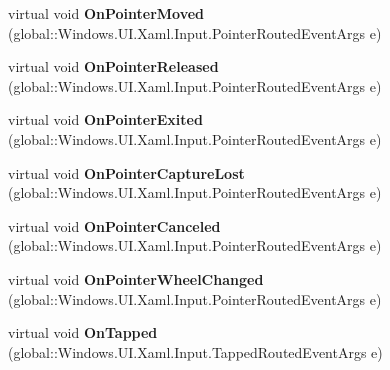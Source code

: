 \begin{DoxyCompactItemize}
virtual void {\bfseries On\+Pointer\+Moved} (global\+::\+Windows.\+U\+I.\+Xaml.\+Input.\+Pointer\+Routed\+Event\+Args e)
\item 
\mbox{\label{class_windows_1_1_u_i_1_1_xaml_1_1_controls_1_1_control_a1a16d49c087d495de68e1f9953a4ebfd}} 
virtual void {\bfseries On\+Pointer\+Released} (global\+::\+Windows.\+U\+I.\+Xaml.\+Input.\+Pointer\+Routed\+Event\+Args e)
\item 
\mbox{\label{class_windows_1_1_u_i_1_1_xaml_1_1_controls_1_1_control_a57ecaf6968ada920336dd8afd70ad576}} 
virtual void {\bfseries On\+Pointer\+Exited} (global\+::\+Windows.\+U\+I.\+Xaml.\+Input.\+Pointer\+Routed\+Event\+Args e)
\item 
\mbox{\label{class_windows_1_1_u_i_1_1_xaml_1_1_controls_1_1_control_a2f9ad5125fbed9d126ebcfd2b0fe794c}} 
virtual void {\bfseries On\+Pointer\+Capture\+Lost} (global\+::\+Windows.\+U\+I.\+Xaml.\+Input.\+Pointer\+Routed\+Event\+Args e)
\item 
\mbox{\label{class_windows_1_1_u_i_1_1_xaml_1_1_controls_1_1_control_a94fec4012722a7b1310cbc30233b7940}} 
virtual void {\bfseries On\+Pointer\+Canceled} (global\+::\+Windows.\+U\+I.\+Xaml.\+Input.\+Pointer\+Routed\+Event\+Args e)
\item 
\mbox{\label{class_windows_1_1_u_i_1_1_xaml_1_1_controls_1_1_control_a05f4eb2e6e829dbc04ce27f21650e77d}} 
virtual void {\bfseries On\+Pointer\+Wheel\+Changed} (global\+::\+Windows.\+U\+I.\+Xaml.\+Input.\+Pointer\+Routed\+Event\+Args e)
\item 
\mbox{\label{class_windows_1_1_u_i_1_1_xaml_1_1_controls_1_1_control_a520b4f7b836bf087965e32998fd5898e}} 
virtual void {\bfseries On\+Tapped} (global\+::\+Windows.\+U\+I.\+Xaml.\+Input.\+Tapped\+Routed\+Event\+Args e)
\item 
\mbox{\label{class_windows_1_1_u_i_1_1_xaml_1_1_controls_1_1_control_a3e02cbf66e1030379acbcae595e718b7}} 

\end{DoxyCompactItemize}
